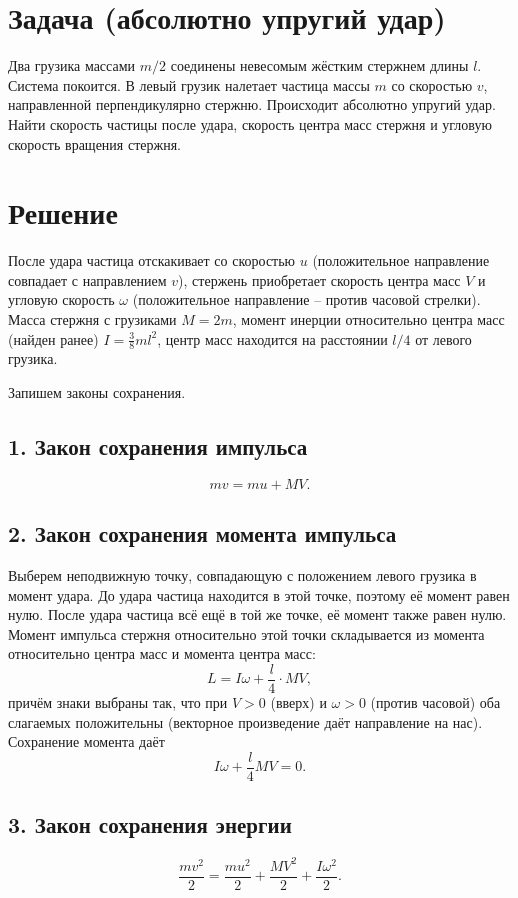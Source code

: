 \documentclass[a4paper,12pt]{article}
\begin{document}
\section*{Задача (абсолютно упругий удар)}

Два грузика массами $m/2$ соединены невесомым жёстким стержнем длины $l$.
Система покоится. В левый грузик налетает частица массы $m$
со скоростью $v$, направленной перпендикулярно стержню. Происходит
абсолютно упругий удар. Найти скорость частицы после удара,
скорость центра масс стержня и угловую скорость вращения стержня.

\section*{Решение}

После удара частица отскакивает со скоростью $u$ (положительное направление
совпадает с направлением $v$), стержень приобретает скорость центра масс
$V$ и угловую скорость $\omega$ (положительное направление -- против часовой
стрелки). Масса стержня с грузиками $M = 2m$, момент инерции относительно
центра масс (найден ранее) $I = \frac{3}{8}ml^2$, центр масс находится на
расстоянии $l/4$ от левого грузика.

Запишем законы сохранения.

\subsection*{1. Закон сохранения импульса}
\[
mv = mu + MV. \tag{1}
\]

\subsection*{2. Закон сохранения момента импульса}
Выберем неподвижную точку, совпадающую с положением левого грузика в момент
удара. До удара частица находится в этой точке, поэтому её момент равен нулю.
После удара частица всё ещё в той же точке, её момент также равен нулю.
Момент импульса стержня относительно этой точки складывается из момента
относительно центра масс и момента центра масс:
\[
L = I\omega + \frac{l}{4}\cdot M V,
\]
причём знаки выбраны так, что при $V>0$ (вверх) и $\omega>0$ (против часовой)
оба слагаемых положительны (векторное произведение даёт направление на нас).
Сохранение момента даёт
\[
I\omega + \frac{l}{4} M V = 0. \tag{2}
\]

\subsection*{3. Закон сохранения энергии}
\[
\frac{mv^2}{2} = \frac{mu^2}{2} + \frac{MV^2}{2} + \frac{I\omega^2}{2}. \tag{3}
\]
\end{document}
